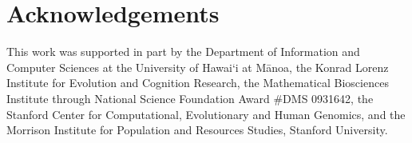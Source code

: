 \documentclass[12pt, twocolumn]{extarticle}
\begin{document}
{\small
\section*{Acknowledgements}

This work was supported in part by 
the Department of Information and Computer Sciences at the University of Hawai`i at M{\=a}noa, 
the Konrad Lorenz Institute for Evolution and Cognition Research, 
the Mathematical Biosciences Institute through National Science Foundation Award \#DMS 0931642, 
the Stanford Center for Computational, Evolutionary and Human Genomics, 
and the Morrison Institute for Population and Resources Studies, Stanford University.
}


%

\end{document}
